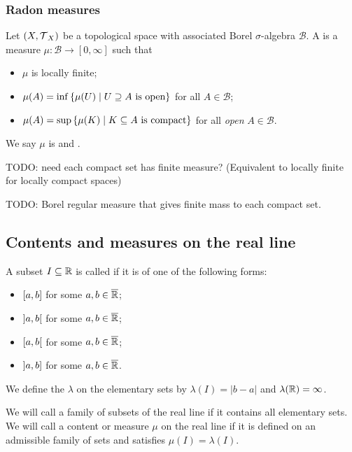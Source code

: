 \subsubsection{Radon measures}
\begin{definition}
Let $\sSet{X, \topology_X}$ be a topological space with associated Borel $\sigma$-algebra $\mathcal{B}$. A  is a measure $\mu: \mathcal{B}\to [0,\infty]$ such that
\begin{itemize}
\item $\mu$ is locally finite;
\item $\mu(A) = \inf\setbuilder{\mu(U)}{\text{$U\supseteq A$ is open}}$ for all $A\in \mathcal{B}$;
\item $\mu(A) = \sup\setbuilder{\mu(K)}{\text{$K\subseteq A$ is compact}}$ for all \emph{open} $A\in \mathcal{B}$.
\end{itemize}
We say $\mu$ is  and .
\end{definition}

TODO: need each compact set has finite measure? (Equivalent to locally finite for locally compact spaces)

TODO: Borel regular measure that gives finite mass to each compact set.


\subsection{Contents and measures on the real line}
\begin{definition}
A subset $I\subseteq \mathbb{R}$ is called  if it is of one of the following forms:
\begin{itemize}
\item $\interval[c]{a,b}$ for some $a,b\in \overline{\mathbb{R}}$;
\item $\interval[o]{a,b}$ for some $a,b\in \overline{\mathbb{R}}$;
\item $\interval[co]{a,b}$ for some $a,b\in \overline{\mathbb{R}}$;
\item $\interval[oc]{a,b}$ for some $a,b\in \overline{\mathbb{R}}$.
\end{itemize}
We define the  $\lambda$ on the elementary sets by $\lambda(I) = |b-a|$ and $\lambda(\mathbb{R}) = \infty$.

We will call a family of subsets of the real line  if it contains all elementary sets. We will call a content or measure $\mu$ on the real line  if it is defined on an admissible family of sets and satisfies $\mu(I) = \lambda(I)$.
\end{definition}


